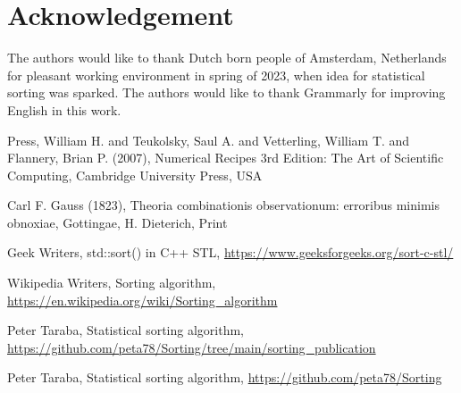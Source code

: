 \documentclass[12pt]{article}
\begin{document}
	\section*{Acknowledgement}
	
	The authors would like to thank Dutch born people of Amsterdam, Netherlands for pleasant working environment in spring of 2023, when idea for statistical sorting was sparked. The authors would like to thank Grammarly for improving English in this work.
	
\begin{thebibliography}{9}
Press, William H. and Teukolsky, Saul A. and Vetterling, William T. and Flannery, Brian P. (2007), Numerical Recipes 3rd Edition: The Art of Scientific Computing, Cambridge University Press, USA

Carl F. Gauss (1823), Theoria combinationis observationum: erroribus minimis obnoxiae, Gottingae, H. Dieterich, Print

Geek Writers, std::sort() in C++ STL, \url{https://www.geeksforgeeks.org/sort-c-stl/}

Wikipedia Writers, Sorting algorithm, \url{https://en.wikipedia.org/wiki/Sorting_algorithm}

Peter Taraba, Statistical sorting algorithm, \url{https://github.com/peta78/Sorting/tree/main/sorting_publication}

Peter Taraba, Statistical sorting algorithm, \url{https://github.com/peta78/Sorting}

\end{thebibliography}

	
	
\end{document}
